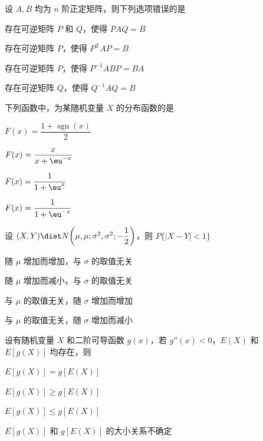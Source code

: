 \begin{question}[index=7]
设 $A,B$ 均为 $n$ 阶正定矩阵，则下列选项错误的是
\begin{choices}[columns=2]
\item 存在可逆矩阵 $P$ 和 $Q$，使得 $PAQ=B$
\item 存在可逆矩阵 $P$，使得 $P^{\mathrm T}AP=B$
\item 存在可逆矩阵 $P$，使得 $P^{-1}ABP=BA$
\item 存在可逆矩阵 $Q$，使得 $Q^{-1}AQ=B$
\end{choices}
\end{question}
\QuestionBreak

\begin{question}[index=8]
下列函数中，为某随机变量 $X$ 的分布函数的是
\begin{choices}[columns=2]
\item $F(x)=\dfrac{1+\operatorname{sgn}(x)}2$
\item $F(x)=\dfrac{x}{x+\eu^{-x}}$
\item $F(x)=\dfrac{1}{1+\eu^x}$
\item $F(x)=\dfrac{1}{1+\eu^{-x}}$
\end{choices}
\end{question}
\QuestionBreak

\begin{question}[index=9]
设 $(X,Y)\dist N\!\left(\mu,\mu;\sigma^2,\sigma^2;-\dfrac12\right)$，则 $P\{|X-Y|<1\}$
\begin{choices}[columns=1]
\item 随 $\mu$ 增加而增加，与 $\sigma$ 的取值无关
\item 随 $\mu$ 增加而减小，与 $\sigma$ 的取值无关
\item 与 $\mu$ 的取值无关，随 $\sigma$ 增加而增加
\item 与 $\mu$ 的取值无关，随 $\sigma$ 增加而减小
\end{choices}
\end{question}
\QuestionBreak

\begin{question}[index=10]
设有随机变量 $X$ 和二阶可导函数 $g(x)$，若 $g''(x)<0$，$E(X)$ 和 $E[g(X)]$ 均存在，则
\begin{choices}[columns=2]
\item $E[g(X)]=g[E(X)]$
\item $E[g(X)]\ge g[E(X)]$
\item $E[g(X)]\le g[E(X)]$
\item $E[g(X)]$ 和 $g[E(X)]$ 的大小关系不确定
\end{choices}
\end{question}
